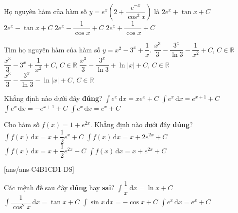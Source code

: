 \begin{ex}%
	Họ nguyên hàm của hàm số $y=e^x\left(2+\dfrac{e^{-x}}{\cos^2x}\right) $ là
	\choice
	{\True $2e^x+\tan x+C$}
	{$2e^x-\tan x+C$}
	{$2e^x-\dfrac{1}{\cos x}+C$}
	{$2e^x+\dfrac{1}{\cos x}+C$}
\end{ex}

\begin{ex}%
	Tìm họ nguyên hàm của hàm số $y=x^2-3^x+\dfrac{1}{x}$.
	\choice
	{$\dfrac{x^3}{3}-\dfrac{3^x}{\ln 3}-\dfrac{1}{x^2}+C,\,C\in \mathbb{R}$}
	{$\dfrac{x^3}{3}-3^x+\dfrac{1}{x^2}+C,\,C\in \mathbb{R}$}
	{\True $\dfrac{x^3}{3}-\dfrac{3^x}{\ln 3}+\ln\left|x\right|+C,\,C\in \mathbb{R}$}
	{$\dfrac{x^3}{3}-\dfrac{3^x}{\ln 3}-\ln\left|x\right|+C,\,C\in \mathbb{R}$}
\end{ex}

\begin{ex}%
	Khẳng định nào dưới đây \textbf{đúng}?
	\choice
	{$\displaystyle\int e^x \mathrm{\,d}x=xe^x+C$}
	{$\displaystyle\int e^x \mathrm{\,d}x=e^{x+1}+C$}
	{$\displaystyle\int e^x \mathrm{\,d}x=-e^{x+1}+C$}
	{\True $\displaystyle\int e^x \mathrm{\,d}x=e^x+C$}
\end{ex}

\begin{ex}%
	Cho hàm số $f(x)=1+e^{2x}$. Khẳng định nào dưới đây \textbf{đúng}?
	\choice
	{$\displaystyle\int f(x) \mathrm{\,d}x=x+\dfrac{1}{2}e^x+C$}
	{$\displaystyle\int f(x) \mathrm{\,d}x=x+2e^{2x}+C$}
	{\True $\displaystyle\int f(x) \mathrm{\,d}x=x+\dfrac{1}{2}e^{2x}+C$}
	{$\displaystyle\int f(x) \mathrm{\,d}x=x+e^{2x}+C$}
\end{ex}
{}[ans/ans-C4B1CD1-DS]
\begin{ex}%
	Các mệnh đề sau đây \textbf{đúng} hay \textbf{sai}?
	\choiceTF
	{$\displaystyle\int \dfrac{1}{x} \mathrm{\,d}x=\ln x+C$}
	{\True $\displaystyle\int \dfrac{1}{\cos^2x} \mathrm{\,d}x=\tan x+C$}
	{\True $\displaystyle\int \sin x \mathrm{\,d}x=-\cos x+C$}
	{\True $\displaystyle\int e^x \mathrm{\,d}x=e^x+C$}
\end{ex}

